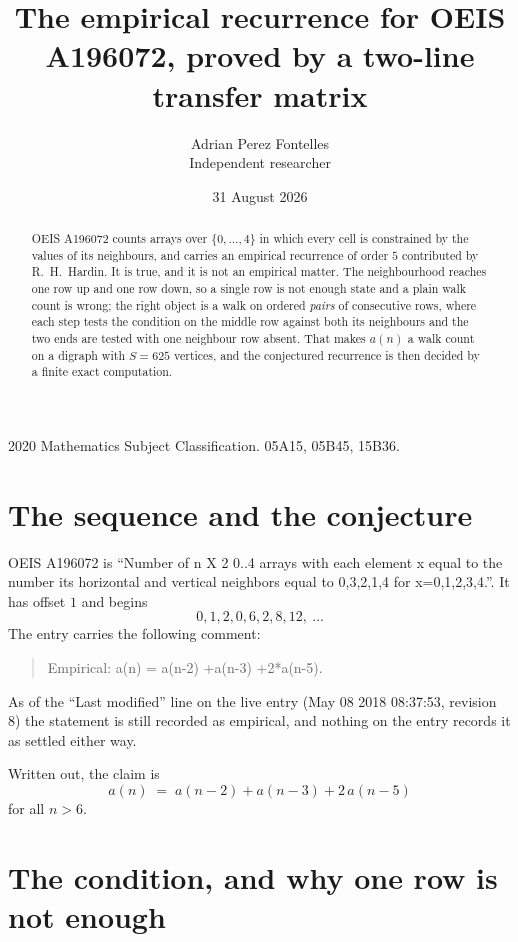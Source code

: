 \documentclass[11pt,a4paper]{article}
\title{The empirical recurrence for OEIS A196072, proved by a two-line transfer matrix}
\author{Adrian Perez Fontelles\\ \small Independent researcher}
\date{31 August 2026}
\theoremstyle{plain}
\theoremstyle{definition}
\begin{document}
\maketitle

\begin{abstract}
OEIS A196072 counts arrays over $\{0,\dots,4\}$ in which every cell is constrained by the
values of its neighbours, and carries an empirical recurrence of order $5$ contributed
by R.~H.~Hardin. It is true, and it is not an empirical matter. The neighbourhood reaches one
row up and one row down, so a single row is not enough state and a plain walk count
is wrong; the right object is a walk on ordered \emph{pairs} of consecutive rows, where
each step tests the condition on the middle row against both its neighbours and the two
ends are tested with one neighbour row absent. That makes $a(n)$ a walk count on a digraph
with $S=625$ vertices, and the conjectured recurrence is then decided by a finite exact
computation.
\end{abstract}

\noindent\small 2020 Mathematics Subject Classification. 05A15, 05B45, 15B36.\normalsize

\section{The sequence and the conjecture}

OEIS A196072 is ``Number of n X 2 0..4 arrays with each element x equal to the number its horizontal and vertical neighbors equal to 0,3,2,1,4 for x=0,1,2,3,4.''. It has offset $1$ and begins
\[
0, 1, 2, 0, 6, 2, 8, 12,\ \dots
\]
The entry carries the following comment:
\begin{quote}\small
Empirical: a(n) = a(n-2) +a(n-3) +2*a(n-5).
\end{quote}
As of the ``Last modified'' line on the live entry (May 08 2018 08:37:53, revision 8) the statement is
still recorded as empirical, and nothing on the entry records it as settled either way.

Written out, the claim is
\begin{equation}\label{eq:conj}
a(n)\;=\;a(n-2) + a(n-3) + 2\,a(n-5)
\end{equation}
for all $n>6$.

\section{The condition, and why one row is not enough}
\end{document}
